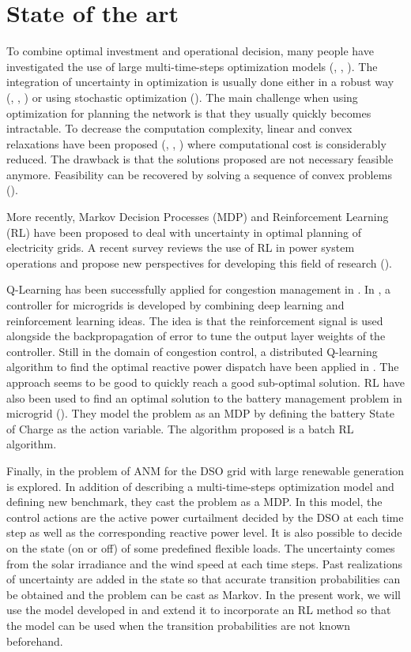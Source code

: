 \section{State of the art}
\label{sec:stateart}

To combine optimal investment and operational decision, many people have investigated the use of large multi-time-steps optimization models (\cite{zonal_int}, \cite{Baker2012OptimalIO}, \cite{paolone}).
The integration of uncertainty in optimization is usually done either in a robust way (\cite{LorcaSun}, \cite{adaptative}, \cite{BM2}) or using stochastic optimization (\cite{Oren}).
The main challenge when using optimization for planning the network is that they usually quickly becomes intractable.
To decrease the computation complexity, linear and convex relaxations have been proposed (\cite{Farivar_Relax1}, \cite{Farivar_Relax2}, \cite{BM1}) where computational cost is considerably reduced.
The drawback is that the solutions proposed are not necessary feasible anymore.
Feasibility can be recovered by solving a sequence of convex problems (\cite{Nali}).

More recently, Markov Decision Processes (MDP) and Reinforcement Learning (RL) have been proposed to deal with uncertainty in optimal planning of electricity grids.
A recent survey reviews the use of RL in power system operations and propose new perspectives for developing this field of research (\cite{RLSurvey}).

Q-Learning has been successfully applied for congestion management in \cite{ZARRABIAN2016179}.
In \cite{fuzzy}, a controller for microgrids is developed by combining deep learning and reinforcement learning ideas.
The idea is that the reinforcement signal is used alongside the backpropagation of error to tune the output layer weights of the controller.
Still in the domain of congestion control, a distributed Q-learning algorithm to find the optimal reactive power dispatch have been applied in \cite{volt_control}.
The approach seems to be good to quickly reach a good sub-optimal solution.
RL have also been used to find an optimal solution to the battery management problem in microgrid (\cite{Battery}).
They model the problem as an MDP by defining the battery State of Charge as the action variable.
The algorithm proposed is a batch RL algorithm.

Finally, in \cite{Gemine} the problem of ANM for the DSO grid with large renewable generation is explored.
In addition of describing a multi-time-steps optimization model and defining new benchmark, they cast the problem as a MDP.
In this model, the control actions are the active power curtailment decided by the DSO at each time step as well as the corresponding reactive power level.
It is also possible to decide on the state (on or off) of some predefined flexible loads.
The uncertainty comes from the solar irradiance and the wind speed at each time steps.
Past realizations of uncertainty are added in the state so that accurate transition probabilities can be obtained and the problem can be cast as Markov.
In the present work, we will use the model developed in \cite{Gemine} and extend it to incorporate an RL method so that the model can be used when the transition probabilities are not known beforehand.
